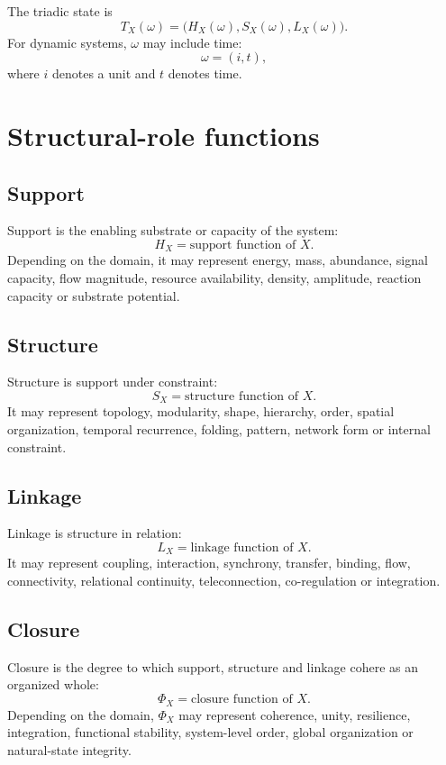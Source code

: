 \documentclass[11pt,a4paper]{article}
\begin{document}
The triadic state is
\[
T_X(\omega)=\big(H_X(\omega),S_X(\omega),L_X(\omega)\big).
\]
For dynamic systems, $\omega$ may include time:
\[
\omega=(i,t),
\]
where $i$ denotes a unit and $t$ denotes time.

\section{Structural-role functions}

\subsection{Support}

Support is the enabling substrate or capacity of the system:
\[
H_X=\text{support function of }X.
\]
Depending on the domain, it may represent energy, mass, abundance, signal capacity, flow magnitude, resource availability, density, amplitude, reaction capacity or substrate potential.

\subsection{Structure}

Structure is support under constraint:
\[
S_X=\text{structure function of }X.
\]
It may represent topology, modularity, shape, hierarchy, order, spatial organization, temporal recurrence, folding, pattern, network form or internal constraint.

\subsection{Linkage}

Linkage is structure in relation:
\[
L_X=\text{linkage function of }X.
\]
It may represent coupling, interaction, synchrony, transfer, binding, flow, connectivity, relational continuity, teleconnection, co-regulation or integration.

\subsection{Closure}

Closure is the degree to which support, structure and linkage cohere as an organized whole:
\[
\Phi_X=\text{closure function of }X.
\]
Depending on the domain, $\Phi_X$ may represent coherence, unity, resilience, integration, functional stability, system-level order, global organization or natural-state integrity.
\end{document}
